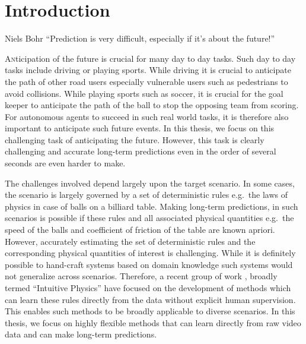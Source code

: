 \chapter{Introduction}
\label{chap:introduction}
\minitoc\vspace{2ex}

\begin{chapquote}{Niels Bohr}
``Prediction is very difficult, especially if it’s about the future!''
\end{chapquote}


\lettrine[lines=3]{A}{n}ticipation of the future is crucial for many day to day tasks.  Such day to day tasks include driving or playing sports.  While driving it is crucial to anticipate the path of other road users especially vulnerable users such as pedestrians  to avoid collisions. While playing sports such as soccer, it is crucial for the goal keeper to anticipate the path of the ball to stop the opposing team from scoring.  For autonomous agents to succeed in such real world tasks,  it is therefore also important to anticipate such future events. In this thesis, we focus on this challenging task of anticipating the future.  However, this task is clearly challenging and accurate long-term predictions even in the order of several seconds are even harder to make. 

The challenges involved depend largely upon the target scenario.  In some cases,  the scenario is largely governed by a set of deterministic rules e.g.\  the laws of physics in case of balls on a billiard table.  Making long-term predictions, in such scenarios is possible if these rules and all associated physical quantities e.g.\ the speed of the balls and coefficient of friction of the table are known apriori.  However,  accurately estimating the set of deterministic rules and the corresponding physical quantities of interest is challenging.  While it is definitely possible to hand-craft systems based on domain knowledge such systems would not generalize across scenarios.  Therefore,  a recent group of work \cite{fragkiadaki2015learning,lerer2016learning,li2016fall,battaglia2016interaction,watters2017visual},  broadly termed ``Intuitive Physics'' have focused on the development of methods which can learn these rules directly from the data without explicit human supervision.  This enables such methods to be broadly applicable to diverse scenarios.  In this thesis, we focus on highly flexible methods that can learn directly from raw video data and can make long-term predictions.

